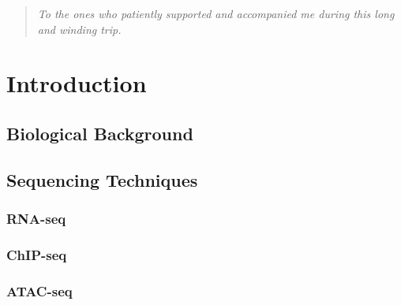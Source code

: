 \documentclass[a4paper, oneside, british, intoc, bibliograph=totoc, index=totoc, BCOR10mm, twoside, openright]{book}
\numberwithin{equation}{section}
\numberwithin{figure}{section}
\begin{document}
\cleardoublepage
{}

\begin{quotation}
\begin{flushright}
\textit{
To the ones who patiently supported and accompanied me during this long and winding trip.
}
\end{flushright}
\end{quotation}


\cleardoublepage


%


\hypersetup{hidelinks} %

\pagestyle{plain}\tableofcontents

\cleardoublepage{}
\pagestyle{fancy}


%
\newpage
{}

\chapter{Introduction} \label{sec:introchap}

\section{Biological Background} \label{sec:bioback}

\section{Sequencing Techniques}\label{sec:seqs}

\subsection{RNA-seq} \label{sec:rnaseq}

\subsection{ChIP-seq} \label{sec:chipseq}

\subsection{ATAC-seq} \label{sec:atacseq}

\end{document}
